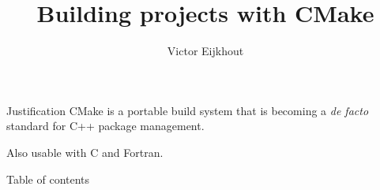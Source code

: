 \documentclass[10pt]{beamer}
\begin{document}

\title[CMake tutorial]{Building projects with CMake}
\author[Eijkhout]{Victor Eijkhout}
\date{\hpcsemester}

\maketitle

\begin{frame}{Justification}
  CMake is a portable build system that is
  becoming a \emph{de facto} standard for C++ package management.

  Also usable with C and Fortran.
\end{frame}

\begin{frame}{Table of contents}
  \tableofcontents
\end{frame}













\end{document}
